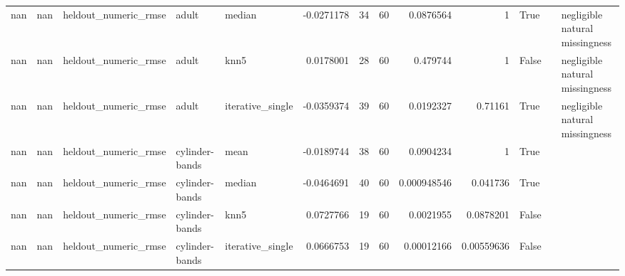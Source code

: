 \begin{table}[ht]
{\begin{tabular}{rrlllrrrrrlll}
        nan &     nan & heldout\_numeric\_rmse           & adult          & median           &     -0.0271178   &                  34 &      60 & 0.0876564   & 1           & True               &                                                                                                                    & negligible natural missingness                                        \\
        nan &     nan & heldout\_numeric\_rmse           & adult          & knn5             &      0.0178001   &                  28 &      60 & 0.479744    & 1           & False              &                                                                                                                    & negligible natural missingness                                        \\
        nan &     nan & heldout\_numeric\_rmse           & adult          & iterative\_single &     -0.0359374   &                  39 &      60 & 0.0192327   & 0.71161     & True               &                                                                                                                    & negligible natural missingness                                        \\
        nan &     nan & heldout\_numeric\_rmse           & cylinder-bands & mean             &     -0.0189744   &                  38 &      60 & 0.0904234   & 1           & True               &                                                                                                                    &                                                                       \\
        nan &     nan & heldout\_numeric\_rmse           & cylinder-bands & median           &     -0.0464691   &                  40 &      60 & 0.000948546 & 0.041736    & True               &                                                                                                                    &                                                                       \\
        nan &     nan & heldout\_numeric\_rmse           & cylinder-bands & knn5             &      0.0727766   &                  19 &      60 & 0.0021955   & 0.0878201   & False              &                                                                                                                    &                                                                       \\
        nan &     nan & heldout\_numeric\_rmse           & cylinder-bands & iterative\_single &      0.0666753   &                  19 &      60 & 0.00012166  & 0.00559636  & False              &                                                                                                                    &                                                                       \\

\end{tabular}}
\end{table}
